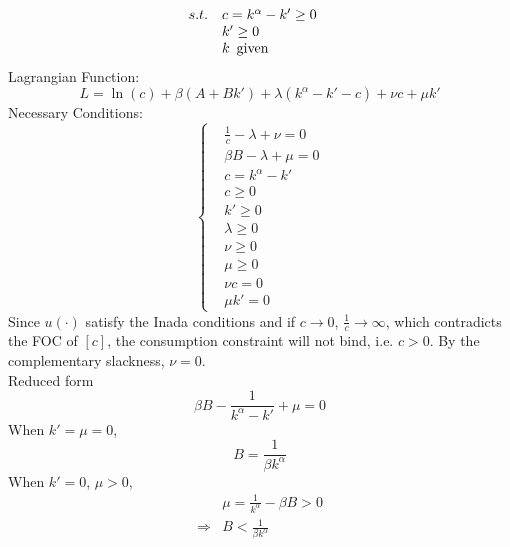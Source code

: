 \documentclass{article}
\begin{document}
\begin{enumerate}
\begin{enumerate}
\begin{align*}
                &\begin{array}{r@{\quad}l}
                    s.t.&c=k^\alpha-k'\ge0\\
                    &k'\ge0\\
                    &k\enspace\text{given} 
                \end{array}
            \end{align*}
            Lagrangian Function:
            \begin{equation*}
                L=\ln(c)+\beta(A+Bk')+\lambda(k^\alpha-k'-c)+\nu c+\mu k'
            \end{equation*}
            Necessary Conditions:
            \begin{equation*}
                \left\{\begin{aligned}
                    &\frac{1}{c}-\lambda+\nu=0\\
                    &\beta B-\lambda+\mu=0\\
                    &c=k^\alpha-k'\\
                    &c\ge0\\
                    &k'\ge0\\
                    &\lambda\ge0\\
                    &\nu\ge0\\
                    &\mu\ge0\\
                    &\nu c=0\\
                    &\mu k'=0
                \end{aligned}\right.
            \end{equation*}
            Since $u(\cdot)$ satisfy the Inada conditions and if $c\to0$, $\frac{1}{c}\to\infty$, which contradicts the FOC of $[c]$, the consumption constraint will not bind, i.e. $c>0$.
            By the complementary slackness, $\nu=0$.\\
            Reduced form
            \begin{equation*}
                \beta B-\frac{1}{k^\alpha-k'}+\mu=0
            \end{equation*}
            When $k'=\mu=0$,
            \begin{equation*}
                B=\frac{1}{\beta k^\alpha}
            \end{equation*}
            When $k'=0$, $\mu>0$,
            \begin{align*}
                &\mu=\frac{1}{k^\alpha}-\beta B>0\\
                \Rightarrow&B<\frac{1}{\beta k^\alpha}

\end{align*}
\end{enumerate}
\end{enumerate}
\end{document}
